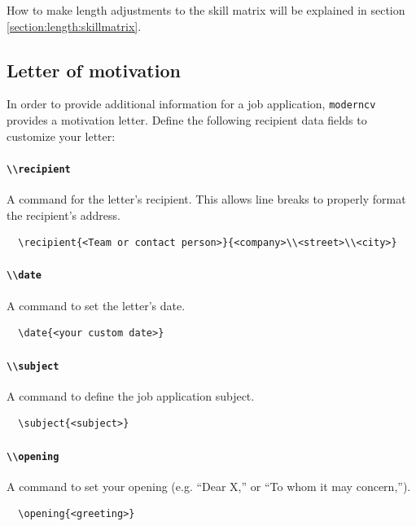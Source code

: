 \documentclass[a4paper, 11pt]{article}
\newcommand{\code}[1]{\lstinline!#1!}
\newcommand{\moderncv}{\code{moderncv}}
\begin{document}
How to make length adjustments to the skill matrix will be explained in section \ref{section:length:skillmatrix}.

\subsection{Letter of motivation}

In order to provide additional information for a job application, {\moderncv} provides a motivation letter. Define the following recipient data fields to customize your letter:
\paragraph{\code{\\recipient}}
A command for the letter's recipient. This allows line breaks to properly format the recipient's address.
\begin{lstlisting}
  \recipient{<Team or contact person>}{<company>\\<street>\\<city>}
\end{lstlisting}

\paragraph{\code{\\date}}
A command to set the letter's date.
\begin{lstlisting}
  \date{<your custom date>}
\end{lstlisting}

\paragraph{\code{\\subject}}
A command to define the job application subject.
\begin{lstlisting}
  \subject{<subject>}
\end{lstlisting}

\paragraph{\code{\\opening}}
A command to set your opening (e.g. ``Dear X,'' or ``To whom it may concern,'').
\begin{lstlisting}
  \opening{<greeting>}
\end{lstlisting}
\end{document}
